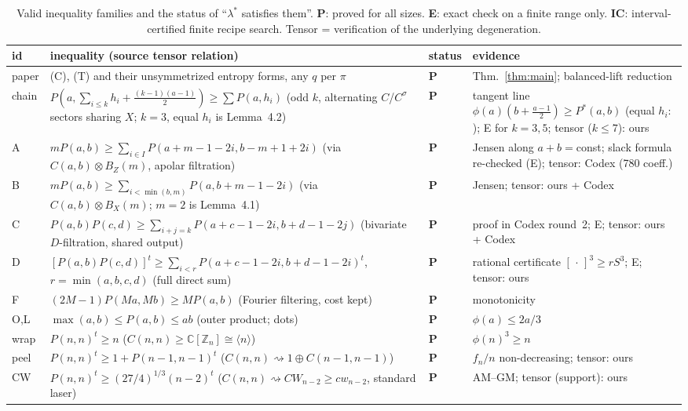 \documentclass[11pt]{amsart}
\theoremstyle{remark}
\newcommand{\degen}{\mathrel{\rightsquigarrow}}
\begin{document}
{\small
\begin{longtable}{p{}p{}p{}p{}}
\caption{Valid inequality families and the status of ``$\lambda^*$
satisfies them''. \textbf{P}: proved for all sizes. \textbf{E}: exact check
on a finite range only. \textbf{IC}: interval-certified finite recipe
search. Tensor = verification of the underlying degeneration.}\label{tab}\\
\toprule
id & inequality (source tensor relation) & status & evidence \\ \midrule
paper & (C), (T) and their unsymmetrized entropy forms, any $q$ per $\pi$ &
\textbf{P} & Thm.~\ref{thm:main}; balanced-lift reduction\\
chain & $P(a,\sum_{i\le k}h_i+\frac{(k-1)(a-1)}2)\ge\sum P(a,h_i)$ (odd
$k$, alternating $C$/$C^\sigma$ sectors sharing $X$; $k=3$, equal $h_i$ is
Lemma~4.2) & \textbf{P} & tangent line $\phi(a)(b+\frac{a-1}2)\ge P^*(a,b)$
(equal $h_i$: \cite{EC}); E for $k=3,5$; tensor ($k\le7$): ours\\
A & $mP(a,b)\ge\sum_{i\in I}P(a+m-1-2i,b-m+1+2i)$ (via
$C(a,b)\otimes B_Z(m)$, apolar filtration) & \textbf{P} & Jensen along
$a+b=$const; slack formula re-checked (E); tensor: Codex (780 coeff.)\\
B & $mP(a,b)\ge\sum_{i<\min(b,m)}P(a,b+m-1-2i)$ (via $C(a,b)\otimes B_X(m)$;
$m=2$ is Lemma~4.1) & \textbf{P} & Jensen; tensor: ours + Codex\\
C & $P(a,b)P(c,d)\ge\sum_{i+j=k}P(a+c-1-2i,b+d-1-2j)$ (bivariate
$D$-filtration, shared output) & \textbf{P} & proof in Codex round~2; E;
tensor: ours + Codex\\
D & $[P(a,b)P(c,d)]^t\ge\sum_{i<r}P(a+c-1-2i,b+d-1-2i)^t$, $r=\min(a,b,c,d)$ (full direct sum)
& \textbf{P} & rational certificate $[\,\cdot\,]^3\ge rS^3$; E; tensor: ours\\
F & $(2M-1)P(Ma,Mb)\ge MP(a,b)$ (Fourier filtering, cost kept) & \textbf{P}
& monotonicity\\
O,L & $\max(a,b)\le P(a,b)\le ab$ (outer product; dots) & \textbf{P} &
$\phi(a)\le 2a/3$\\
wrap & $P(n,n)^t\ge n$ ($C(n,n)\ge\mathbb C[\mathbb Z_n]\cong\langle
n\rangle$) & \textbf{P} & $\phi(n)^3\ge n$\\
peel & $P(n,n)^t\ge1+P(n-1,n-1)^t$ ($C(n,n)\degen1\oplus C(n-1,n-1)$) &
\textbf{P} & $f_n/n$ non-decreasing; tensor: ours\\
CW & $P(n,n)^t\ge(27/4)^{1/3}(n-2)^t$ ($C(n,n)\degen CW_{n-2}\ge cw_{n-2}$,
standard laser) & \textbf{P} & AM--GM; tensor (support): ours\\

\end{longtable}}
\end{document}
